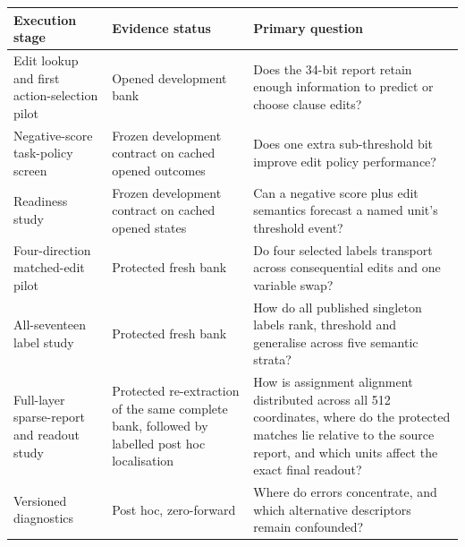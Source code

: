 \documentclass[
  british,
  11pt,
  a4paper,
]{article}
\newcounter{none} %
\begin{document}
{\def\LTcaptype{none} %
\begin{longtable}[]{@{}
  >{\raggedright\arraybackslash}p{}
  >{\raggedright\arraybackslash}p{}
  >{\raggedright\arraybackslash}p{}@{}}
\toprule\noalign{}
\begin{minipage}[b]{\linewidth}\raggedright
Execution stage
\end{minipage} & \begin{minipage}[b]{\linewidth}\raggedright
Evidence status
\end{minipage} & \begin{minipage}[b]{\linewidth}\raggedright
Primary question
\end{minipage} \\
\midrule\noalign{}
\endhead
\bottomrule\noalign{}
\endlastfoot
Edit lookup and first action-selection pilot & Opened development bank &
Does the 34-bit report retain enough information to predict or choose
clause edits? \\
Negative-score task-policy screen & Frozen development contract on
cached opened outcomes & Does one extra sub-threshold bit improve edit
policy performance? \\
Readiness study & Frozen development contract on cached opened states &
Can a negative score plus edit semantics forecast a named unit's
threshold event? \\
Four-direction matched-edit pilot & Protected fresh bank & Do four
selected labels transport across consequential edits and one variable
swap? \\
All-seventeen label study & Protected fresh bank & How do all published
singleton labels rank, threshold and generalise across five semantic
strata? \\
Full-layer sparse-report and readout study & Protected re-extraction of
the same complete bank, followed by labelled post hoc localisation & How
is assignment alignment distributed across all 512 coordinates, where do
the protected matches lie relative to the source report, and which units
affect the exact final readout? \\
Versioned diagnostics & Post hoc, zero-forward & Where do errors
concentrate, and which alternative descriptors remain confounded? \\
\end{longtable}
}
\end{document}
